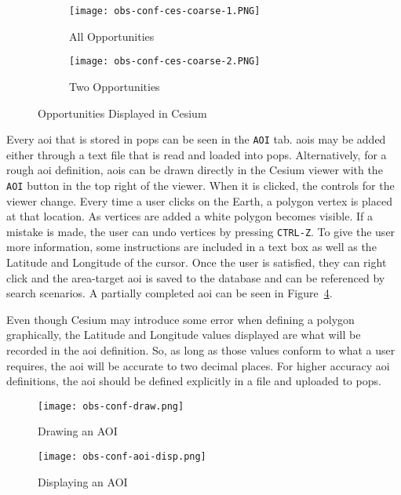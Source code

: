 \begin{figure}
    \centering
    \begin{subfigure}[b]{0.95\textwidth}
	\texttt{[image: obs-conf-ces-coarse-1.PNG]} 
	\caption{All Opportunities}
	\label{fig:obs-conf-ci-1} 
    \end{subfigure}
    \hfill
    \begin{subfigure}[b]{0.95\textwidth}
	\texttt{[image: obs-conf-ces-coarse-2.PNG]} 
	\caption{Two Opportunities}
	\label{fig:obs-conf-ci-2} 
    \end{subfigure}
    \caption{Opportunities Displayed in Cesium}
    \label{fig:obs-conf-ci} 
\end{figure}

Every \gls{aoi} that is stored in \gls{pops} can be seen in the \texttt{AOI}
tab. \glspl{aoi} may be added either through a text file that is read and
loaded into \gls{pops}. Alternatively, for a rough \gls{aoi} definition,
\glspl{aoi} can be drawn directly in the Cesium viewer with the \texttt{AOI}
button in the top right of the viewer.  When it is clicked, the controls for
the viewer change.  Every time a user clicks on the Earth, a polygon vertex is
placed at that location. As vertices are added a white polygon becomes visible.
If a mistake is made, the user can undo vertices by pressing \texttt{CTRL-Z}.
To give the user more information, some instructions are included in a text box
as well as the Latitude and Longitude of the cursor.  Once the user is
satisfied, they can right click and the area-target \gls{aoi} is saved to the
database and can be referenced by search scenarios. A partially completed
\gls{aoi} can be seen in Figure~\ref{fig:obs-conf-draw}. 

Even though Cesium may introduce some error when defining a polygon
graphically, the Latitude and Longitude values displayed are what will be
recorded in the \gls{aoi} definition. So, as long as those values conform to
what a user requires, the \gls{aoi} will be accurate to two decimal places. For
higher accuracy \gls{aoi} definitions, the \gls{aoi} should be defined
explicitly in a file and uploaded to \gls{pops}.

\begin{figure}
    \centering
    \texttt{[image: obs-conf-draw.png]} 
    \caption{Drawing an AOI}
    \label{fig:obs-conf-draw} 
\end{figure}

\begin{figure}
    \centering
    \texttt{[image: obs-conf-aoi-disp.png]} 
    \caption{Displaying an AOI}
    \label{fig:obs-conf-aoi-display} 
\end{figure}

